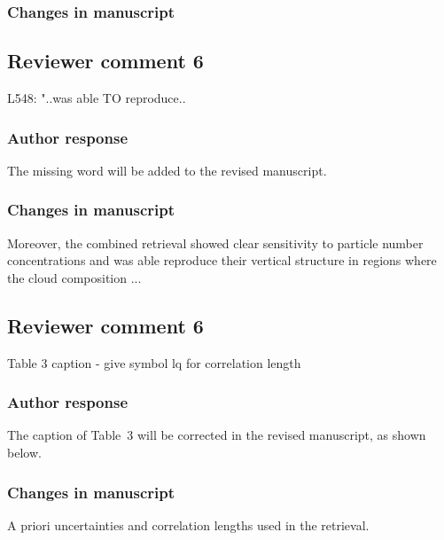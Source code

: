 \subsubsection*{Changes in manuscript}

\begin{change}[523]
 \DIFaddbegin {}
 \end{change}


\subsection*{Reviewer comment 6}

 L548: "..was able TO reproduce.. 


\subsubsection*{Author response}
The missing word will be added to the revised manuscript.

\subsubsection*{Changes in manuscript}

\begin{change}[548]
Moreover, the combined retrieval showed clear sensitivity to particle number
concentrations and was able \DIFaddbegin {}\DIFaddend reproduce their
vertical structure in regions where the cloud composition ...
\end{change}

\subsection*{Reviewer comment 6}

 Table 3 caption - give symbol lq for correlation length

\subsubsection*{Author response}

The caption of Table~3 will be corrected in the revised manuscript, as shown
below.

\subsubsection*{Changes in manuscript}

\begin{change}[218]
A priori uncertainties \DIFaddbeginFL {}\DIFaddendFL and correlation lengths \DIFaddbeginFL {}\DIFaddendFL used in the retrieval.
\end{change}
